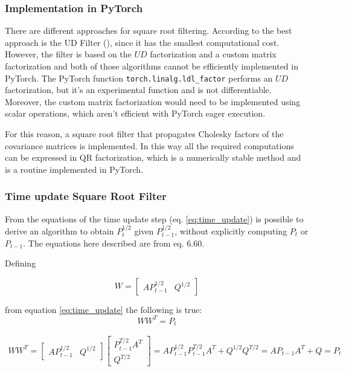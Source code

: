 \documentclass{article}
\begin{document}
\subsubsection{Implementation in PyTorch}

There are different approaches for square root filtering. According to \cite{mohinder_s_grewal_kalman_2001} the best approach is the UD Filter (\cite{bierman_numerical_1977}), since it has the smallest computational cost. However, the filter is based on the $UD$ factorization and a custom matrix factorization \cite{mohinder_s_grewal_kalman_2001} and both of those algorithms cannot be efficiently implemented in PyTorch. The PyTorch function \verb|torch.linalg.ldl_factor| performs an $UD$ factorization, but it's an experimental function and is not differentiable. Moreover, the custom matrix factorization would need to be implemented using scalar operations, which aren't efficient with PyTorch eager execution.

For this reason, a square root filter that propagates Cholesky factors of the covariance matrices is implemented. In this way all the required computations can be expressed in QR factorization, which is a numerically stable method and is a routine implemented in PyTorch.

\subsubsection{Time update Square Root Filter}

From the equations of the time update step (eq. \ref{eq:time_update}) is possible to derive an algorithm to obtain $P_t^{1/2}$ given $P_{t-1}^{1/2}$, without explicitly computing $P_t$ or $P_{t-1}$. The equations here described are from \cite{mohinder_s_grewal_kalman_2001} eq. 6.60.

Defining

\begin{equation}
    W = \begin{bmatrix}AP_{t-1}^{1/2} & Q^{1/2}\end{bmatrix}
\end{equation}

from equation \ref{eq:time_update} the following is true:
\begin{equation}\label{time_update_SR_mult}
WW^T = P_t 
\end{equation}

\begin{multline}
  WW^T =  \begin{bmatrix}AP_{t-1}^{1/2} & Q^{1/2}\end{bmatrix}\begin{bmatrix}P_{t-1}^{T/2}A^T \\ Q^{T/2}\end{bmatrix}
  = AP_{t-1}^{1/2}P_{t-1}^{T/2}A^T + Q^{1/2}Q^{T/2} = AP_{t-1}A^T + Q = P_t
\end{multline}
\end{document}
